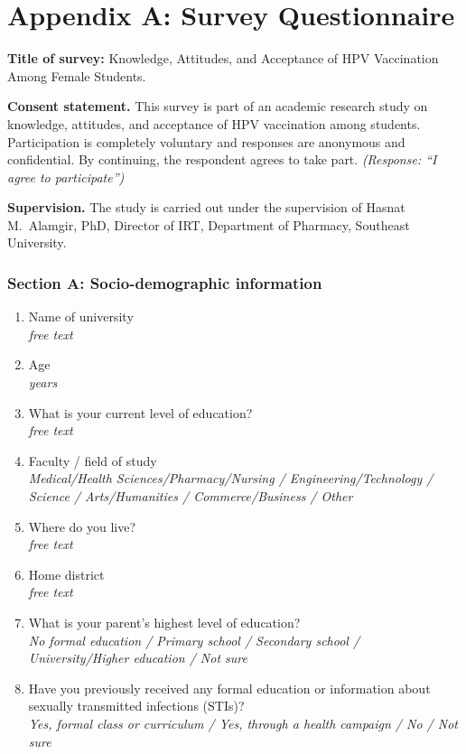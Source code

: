 \chapter{Appendix A: Survey Questionnaire}
\onehalfspacing\small
\textbf{Title of survey:} Knowledge, Attitudes, and Acceptance of HPV Vaccination Among Female Students.

\textbf{Consent statement.} This survey is part of an academic research study on knowledge, attitudes, and acceptance of HPV vaccination among students. Participation is completely voluntary and responses are anonymous and confidential. By continuing, the respondent agrees to take part. \textit{(Response: ``I agree to participate'')}

\textbf{Supervision.} The study is carried out under the supervision of Hasnat M.\ Alamgir, PhD, Director of IRT, Department of Pharmacy, Southeast University.

\subsection*{Section A: Socio-demographic information}
\begin{enumerate}[leftmargin=*,itemsep=3pt]
\item Name of university\\\hspace*{1em}\textit{free text}
\item Age\\\hspace*{1em}\textit{years}
\item What is your current level of education?\\\hspace*{1em}\textit{free text}
\item Faculty / field of study\\\hspace*{1em}\textit{Medical/Health Sciences/Pharmacy/Nursing / Engineering/Technology / Science / Arts/Humanities / Commerce/Business / Other}
\item Where do you live?\\\hspace*{1em}\textit{free text}
\item Home district\\\hspace*{1em}\textit{free text}
\item What is your parent's highest level of education?\\\hspace*{1em}\textit{No formal education / Primary school / Secondary school / University/Higher education / Not sure}
\item Have you previously received any formal education or information about sexually transmitted infections (STIs)?\\\hspace*{1em}\textit{Yes, formal class or curriculum / Yes, through a health campaign / No / Not sure}
\end{enumerate}
